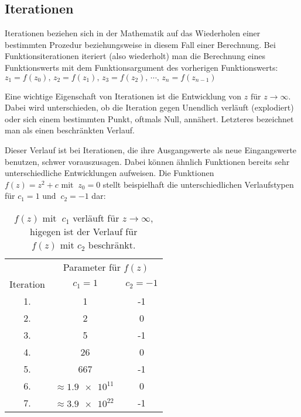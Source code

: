 \subsection{Iterationen}\label{subsec:iterations}

Iterationen beziehen sich in der Mathematik auf das Wiederholen einer bestimmten
Prozedur beziehungsweise in diesem Fall einer Berechnung.
Bei Funktionsiterationen iteriert (also wiederholt) man die Berechnung eines
Funktionswerts mit dem Funktionsargument des vorherigen Funktionswerts:
\(z_1 = f(z_0),\, z_2 = f(z_1),\, z_3 = f(z_2),\, \cdots,\, z_n = f(z_{n-1})\)

Eine wichtige Eigenschaft von
Iterationen ist die Entwicklung von \(z \text{ für } z \to \infty\).
Dabei wird unterschieden, ob die Iteration gegen Unendlich verläuft
(\glqq explodiert\grqq ) oder sich einem bestimmten Punkt, oftmals Null, ann\"ahert.
Letzteres bezeichnet man als einen beschränkten Verlauf.

Dieser Verlauf ist bei Iterationen, die ihre Ausgangswerte als neue Eingangswerte
benutzen, schwer vorauszusagen.
Dabei k\"onnen \"ahnlich Funktionen bereits sehr unterschiedliche Entwicklungen aufweisen.
Die Funktionen \(f(z) = z^2 + c \text{ mit }\ z_0 = 0\) stellt beispielhaft
die unterschiedlichen Verlaufstypen für \(c_1 = 1 \text{ und }\ c_2 = -1\) dar:

\begin{table}[h!]\label{tab:iterations-example}
  \centering
  \begin{tabular}{@{}ccc@{}}
    \toprule
    & \multicolumn{2}{c}{Parameter für \(f(z)\)} \\
    \cmidrule(lr){2-3}
    Iteration & \( c_1 = 1\) & \( c_2 = -1\) \\
    \midrule
    1. & 1 & -1 \\
    2. & 2 & 0 \\
    3. & 5 & -1 \\
    4. & 26 & 0 \\
    5. & 667 & -1 \\
    6. & \(\approx \num{1,9e11}\ \) & 0 \\
    7. & \(\approx \num{3,9e22}\ \) & -1 \\
    \bottomrule
  \end{tabular}
  \caption{
    \(f(z) \text{ mit }\ c_1\) verl\"auft f\"ur \(z \to \infty\),
    higegen ist der Verlauf f\"ur \(f(z) \text{ mit } c_2\) beschr\"ankt.
  }
\end{table}